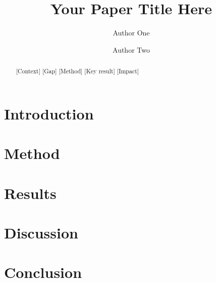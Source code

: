 \documentclass[aps,prl,reprint,superscriptaddress]{revtex4-2}
\title{Your Paper Title Here}
\author{Author One}
\affiliation{Department, Institution One}
\author{Author Two}
\affiliation{Department, Institution Two}
\begin{document}
\maketitle

\begin{abstract}
  [Context] [Gap] [Method] [Key result] [Impact]
\end{abstract}

\section{Introduction}
\section{Method}
\section{Results}
\section{Discussion}
\section{Conclusion}


\end{document}
